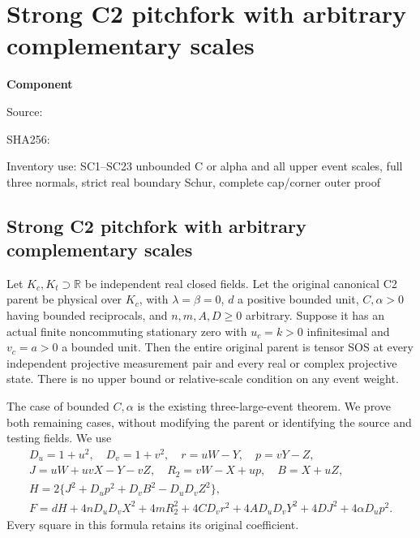 \chapter{Strong C2 pitchfork with arbitrary complementary scales}
\label{component:pf7943b34a7dc}
\noindent\textbf{Component }\par
{\small\noindent Source: \par}
{\small\noindent SHA256: \par}
{\small\noindent Inventory use: SC1--SC23 unbounded C or alpha and all upper event scales, full three normals, strict real boundary Schur, complete cap/corner outer proof\par}
\medskip
\section[Strong C2 pitchfork with arbitrary complementary scales]{Strong C2 pitchfork with arbitrary complementary scales}
\label{pf7943b34a7dc:sec:strong-complement-pitchfork}

\begin{theorem}
\label{pf7943b34a7dc:thm:strong-complement-pitchfork}
Let $K_c,K_t\supset\mathbb R$ be independent real closed fields.
Let the original canonical C2 parent be physical over $K_c$, with
$\lambda=\beta=0$, $d$ a positive bounded unit, $C,\alpha>0$
having bounded reciprocals, and $n,m,A,D\geq0$ arbitrary.
Suppose it has an actual finite noncommuting stationary zero with
$u_c=k>0$ infinitesimal and $v_c=a>0$ a bounded unit.
Then the entire original parent is tensor SOS at every independent
projective measurement pair and every real or complex projective state.
There is no upper bound or relative-scale condition on any event weight.
\end{theorem}

The case of bounded $C,\alpha$ is the existing three-large-event
theorem. We prove both remaining cases, without modifying the parent
or identifying the source and testing fields. We use
\[
\begin{gathered}
 D_u=1+u^2,\quad D_v=1+v^2,\quad r=uW-Y,\quad p=vY-Z,\\
 J=uW+uvX-Y-vZ,\quad R_2=vW-X+up,\quad B=X+uZ,\\
 H=2\{J^2+D_up^2+D_vB^2-D_uD_vZ^2\},\\
 F=dH+4nD_uD_vX^2+4mR_2^2+4CD_vr^2
       +4AD_uD_vY^2+4DJ^2+4\alpha D_up^2.              
\end{gathered}
\tag{SC1}
\]
Every square in this formula retains its original coefficient.

